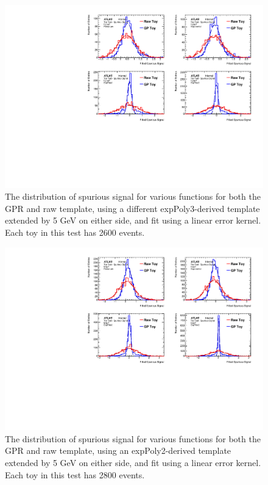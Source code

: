 \begin{figure} 
\begin{center}
  \includegraphics[width=\textwidth]{figures/background/gpr/validation/linear/ToyTest_FitSigVals_highpT_2600_noSig}   
\caption{The distribution of spurious signal for various functions for both the GPR and raw template, using a different expPoly3-derived template extended by 5 GeV on either side, and fit using a linear error kernel. Each toy in this test has 2600 events.}
\label{fig:linearkernel_highpt_2600_noSig}
\end{center}
\end{figure}

\begin{figure} 
\begin{center}
  \includegraphics[width=\textwidth]{figures/background/gpr/validation/linear/ToyTest_FitSigVals_lowpT_2800_noSig}   
\caption{The distribution of spurious signal for various functions for both the GPR and raw template, using an expPoly2-derived template extended by 5 GeV on either side, and fit using a linear error kernel. Each toy in this test has 2800 events.}
\label{fig:linearkernel_lowpt_2800_noSig}
\end{center}
\end{figure}

